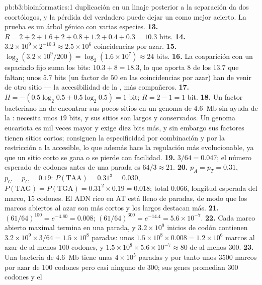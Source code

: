 \begin{solution}{pb:b3:bioinformatics:1}
duplicación en un linaje posterior a la separación da dos coortólogos, y
la pérdida del  verdadero puede dejar un  como mejor
acierto. La prueba es un árbol génico con varias especies.
\textbf{13.} $R = 2 + 2 + 1.6 + 2 + 0.8 + 1.2 + 0.4 + 0.3 = 10.3$ bits.
\textbf{14.} $3.2\times 10^{9}\times 2^{-10.3} \approx 2.5\times 10^{6}$
coincidencias por azar.
\textbf{15.} $\log_{2}(3.2\times 10^{9}/200) = \log_{2}(1.6\times 10^{7})
\approx 24$ bits.
\textbf{16.} La coaparición con un espaciado fijo suma los bits: $10.3 + 8 =
18.3$, lo que aporta $8$ de los $13.7$ que faltan; unos $5.7$ bits (un
factor de $50$ en las coincidencias por azar) han de venir de otro sitio
--- la accesibilidad de la , más compañeros.
\textbf{17.} $H = -(0.5\log_{2}0.5 + 0.5\log_{2}0.5) = 1$ bit; $R = 2 -
1 = 1$ bit.
\textbf{18.} Un factor bacteriano ha de encontrar sus pocos sitios en un
genoma de \qty{4.6}{Mb} sin ayuda de la : necesita unos $19$
bits, y sus sitios son largos y conservados. Un genoma eucariota es mil
veces mayor y exige diez bits más, y sin embargo sus factores tienen
sitios cortos; consiguen la especificidad por combinación y por la
restricción a la  accesible, lo que además hace la regulación
más evolucionable, ya que un sitio corto se gana o se pierde con
facilidad.
\textbf{19.} $3/64 = 0.047$; el número esperado de codones antes de una
parada es $64/3 \approx 21$.
\textbf{20.} $p_{A} = p_{T} = 0.31$, $p_{G} = p_{C} = 0.19$: $P(\text{TAA})
= 0.31^{3} = 0.030$, $P(\text{TAG}) = P(\text{TGA}) = 0.31^{2}\times 0.19
= 0.018$; total $0.066$, longitud esperada del marco, $15$ codones. El
ADN rico en AT está lleno de paradas, de modo que los marcos abiertos al
azar son más cortos y los largos destacan más.
\textbf{21.} $(61/64)^{100} = e^{-4.80} = 0.008$; $(61/64)^{300} =
e^{-14.4} = 5.6\times 10^{-7}$.
\textbf{22.} Cada marco abierto maximal termina en una parada, y $3.2\times
10^{9}$ inicios de codón contienen $3.2\times 10^{9}\times 3/64 = 1.5\times
10^{8}$ paradas: unos $1.5\times 10^{8}\times 0.008 = 1.2\times 10^{6}$
marcos al azar de al menos $100$ codones, y $1.5\times 10^{8}\times
5.6\times 10^{-7} \approx 80$ de al menos $300$.
\textbf{23.} Una bacteria de \qty{4.6}{Mb} tiene unas $4\times 10^{5}$
paradas y por tanto unos \num{3500} marcos por azar de $100$ codones pero
casi ninguno de $300$; sus genes promedian $300$ codones y el

\end{solution}
